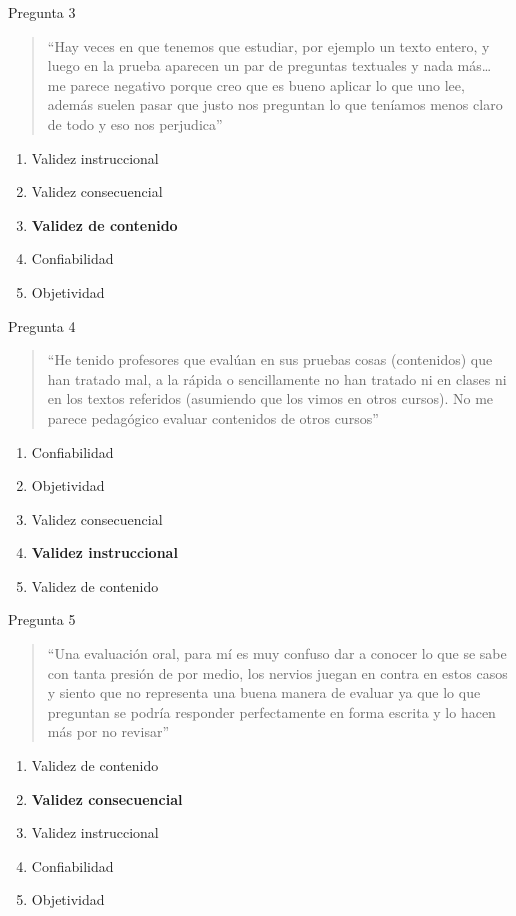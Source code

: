 \documentclass[11pt, aspectratio=169, xcolor=table,hyphens]{beamer}
\begin{document}
\begin{frame}{Pregunta 3}
	\begin{quote}
		``Hay veces en que tenemos que estudiar, por ejemplo un texto entero, y luego en la prueba aparecen un par de preguntas textuales y nada más… me parece negativo porque creo que es bueno aplicar lo que uno lee, además suelen pasar que justo nos preguntan lo que teníamos menos claro de todo y eso nos perjudica''
	\end{quote}
	\begin{enumerate}
		\item[A.] Validez instruccional
		\item[B.] Validez consecuencial
		\item[C.] \textbf<2->{Validez de contenido}
		\item[D.] Confiabilidad
		\item[E.] Objetividad
	\end{enumerate}
\end{frame}

\begin{frame}{Pregunta 4}
	\begin{quote}
		``He tenido profesores que evalúan en sus pruebas cosas (contenidos) que han tratado mal, a la rápida o sencillamente no han tratado ni en clases ni en los textos referidos (asumiendo que los vimos en otros cursos). No me parece pedagógico evaluar contenidos de otros cursos''
	\end{quote}
	\begin{enumerate}
		\item[A.] Confiabilidad
		\item[B.] Objetividad
		\item[C.] Validez consecuencial
		\item[D.] \textbf<2->{Validez instruccional}
		\item[E.] Validez de contenido
	\end{enumerate}
\end{frame}

\begin{frame}{Pregunta 5}
	\begin{quote}
		``Una evaluación oral, para mí es muy confuso dar a conocer lo que se sabe con tanta presión de por medio, los nervios juegan en contra en estos casos y siento que no representa una buena manera de evaluar ya que lo que preguntan se podría responder perfectamente en forma escrita y lo hacen más por no revisar''
	\end{quote}
	\begin{enumerate}
		\item[A.] Validez de contenido
		\item[B.] \textbf<2->{Validez consecuencial}
		\item[C.] Validez instruccional
		\item[D.] Confiabilidad
		\item[E.] Objetividad
	\end{enumerate}
\end{frame}
\end{document}
